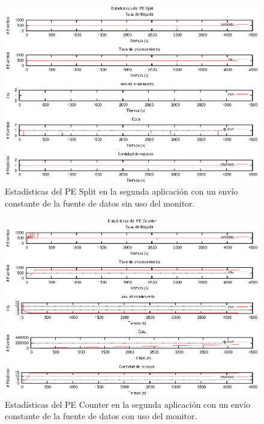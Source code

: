 \begin{figure}[p]
\centering
    \includegraphics[scale=1.1]{images/exp/app2/uniform/sm/statusSplitPE.eps}
    \caption{Estadísticas del PE Split en la segunda aplicación con un envío constante de la fuente de datos sin uso del monitor.}
    \label{fig:app2-uniform-statusSplitPE-sm}
\end{figure}

\begin{figure}[p]
\centering
    \includegraphics[scale=1.1]{images/exp/app2/uniform/cm/statusCounterPE.eps}
    \caption{Estadísticas del PE Counter en la segunda aplicación con un envío constante de la fuente de datos con uso del monitor.}
    \label{fig:app2-uniform-statusCounterPE-cm}
\end{figure}

